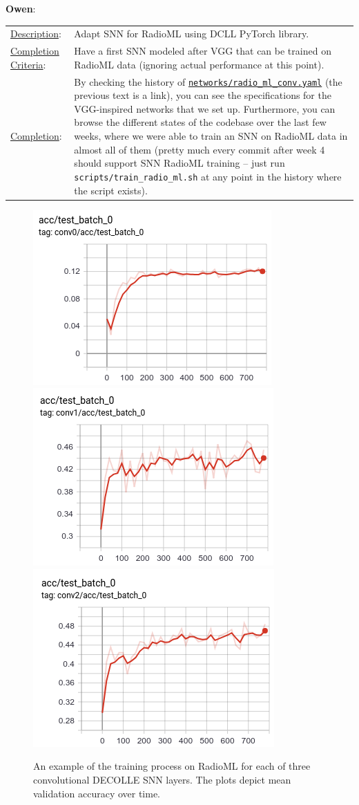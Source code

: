 \documentclass[parskip=true, 10pt]{scrartcl}
\begin{document}
\textsf{\textbf{Owen}}:

\begin{tabularx}{\textwidth}{p{3.5cm} p{10cm}}
\underline{Description}: & Adapt SNN for RadioML using DCLL PyTorch library.\\

\underline{Completion Criteria}: & Have a first SNN modeled after VGG that can be trained on RadioML data (ignoring actual performance at this point). \\
\underline{Completion}: & By checking the history of \href{https://github.com/ohjay/snn-modulation-classification/blob/master/networks/radio_ml_conv.yaml}{\tt networks/radio\_ml\_conv.yaml} (the previous text is a link), you can see the specifications for the VGG-inspired networks that we set up. Furthermore, you can browse the different states of the codebase over the last few weeks, where we were able to train an SNN on RadioML data in almost all of them (pretty much every commit after week 4 should support SNN RadioML training -- just run {\tt scripts/train\_radio\_ml.sh} at any point in the history where the script exists).
\end{tabularx}

\begin{figure}[H]
\centering
\includegraphics[width=0.3\columnwidth]{rml_snn_acc3.png}~
\includegraphics[width=0.3\columnwidth]{rml_snn_acc2.png}~
\includegraphics[width=0.3\columnwidth]{rml_snn_acc1.png}
\caption{An example of the training process on RadioML for each of three convolutional DECOLLE SNN layers. The plots depict mean validation accuracy over time.}
\end{figure}
\end{document}
